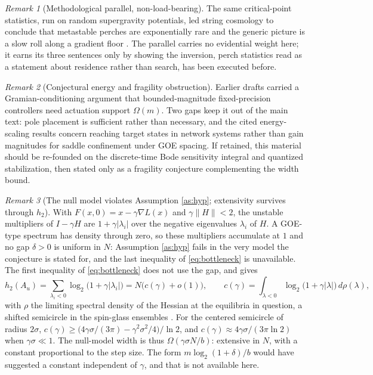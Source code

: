 \documentclass[11pt]{article}
\theoremstyle{definition}
\theoremstyle{remark}
\newtheorem{remark}{Remark}[section]
\newcommand{\Au}{A_u}
\newcommand{\htwo}{h_2}
\begin{document}
\begin{remark}[Methodological parallel, non-load-bearing]
The same critical-point statistics, run on random supergravity potentials, led string cosmology to conclude that metastable perches are exponentially rare and the generic picture is a slow roll along a gradient floor \cite{marsh2012}. The parallel carries no evidential weight here; it earns its three sentences only by showing the inversion, perch statistics read as a statement about residence rather than search, has been executed before.
\end{remark}

\begin{remark}[Conjectural energy and fragility obstruction]
Earlier drafts carried a Gramian-conditioning argument that bounded-magnitude fixed-precision controllers need actuation support $\Omega(m)$. Two gaps keep it out of the main text: pole placement is sufficient rather than necessary, and the cited energy-scaling results concern reaching target states in network systems rather than gain magnitudes for saddle confinement under GOE spacing. If retained, this material should be re-founded on the discrete-time Bode sensitivity integral \cite{mohtadi1990,freudenberg1985} and quantized stabilization, then stated only as a fragility conjecture complementing the width bound.
\end{remark}

\begin{remark}[The null model violates Assumption \ref{as:hyp}; extensivity survives through $\htwo$]\label{rem:nullgap}
With $F(x,0)=x-\gamma\nabla L(x)$ and $\gamma\|H\|<2$, the unstable multipliers of $I-\gamma H$ are $1+\gamma|\lambda_i|$ over the negative eigenvalues $\lambda_i$ of $H$. A GOE-type spectrum has density through zero, so these multipliers accumulate at $1$ and no gap $\delta>0$ is uniform in $N$: Assumption \ref{as:hyp} fails in the very model the conjecture is stated for, and the last inequality of \eqref{eq:bottleneck} is unavailable. The first inequality of \eqref{eq:bottleneck} does not use the gap, and gives
\begin{equation*}
\htwo(\Au)=\sum_{\lambda_i<0}\log_2\!\big(1+\gamma|\lambda_i|\big)=N\big(c(\gamma)+o(1)\big),\qquad c(\gamma)=\int_{\lambda<0}\log_2\!\big(1+\gamma|\lambda|\big)\,d\rho(\lambda),
\end{equation*}
with $\rho$ the limiting spectral density of the Hessian at the equilibria in question, a shifted semicircle in the spin-glass ensembles \cite{auffinger2013}. For the centered semicircle of radius $2\sigma$, $c(\gamma)\ge\big(4\gamma\sigma/(3\pi)-\gamma^2\sigma^2/4\big)/\ln2$, and $c(\gamma)\approx4\gamma\sigma/(3\pi\ln2)$ when $\gamma\sigma\ll1$. The null-model width is thus $\Omega(\gamma\sigma N/b)$: extensive in $N$, with a constant proportional to the step size. The form $m\log_2(1+\delta)/b$ would have suggested a constant independent of $\gamma$, and that is not available here.
\end{remark}
\end{document}
